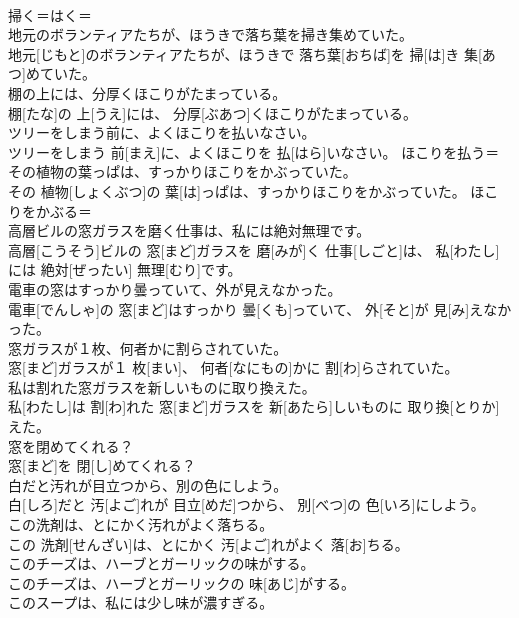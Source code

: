 \documentclass[8pt]{extreport}
\begin{document}
\begin{CJK}{UTF8}{min}
\\	掃く＝はく＝ 
\\	地元のボランティアたちが、ほうきで落ち葉を掃き集めていた。	
\\	地元[じもと]のボランティアたちが、ほうきで 落ち葉[おちば]を 掃[は]き 集[あつ]めていた。	
\\	棚の上には、分厚くほこりがたまっている。	
\\	棚[たな]の 上[うえ]には、 分厚[ぶあつ]くほこりがたまっている。	
\\	ツリーをしまう前に、よくほこりを払いなさい。	
\\	ツリーをしまう 前[まえ]に、よくほこりを 払[はら]いなさい。	ほこりを払う＝ 
\\	その植物の葉っぱは、すっかりほこりをかぶっていた。	
\\	その 植物[しょくぶつ]の 葉[は]っぱは、すっかりほこりをかぶっていた。	ほこりをかぶる＝ 
\\	高層ビルの窓ガラスを磨く仕事は、私には絶対無理です。	
\\	高層[こうそう]ビルの 窓[まど]ガラスを 磨[みが]く 仕事[しごと]は、 私[わたし]には 絶対[ぜったい] 無理[むり]です。	
\\	電車の窓はすっかり曇っていて、外が見えなかった。	
\\	電車[でんしゃ]の 窓[まど]はすっかり 曇[くも]っていて、 外[そと]が 見[み]えなかった。	
\\	窓ガラスが１枚、何者かに割らされていた。	
\\	窓[まど]ガラスが１ 枚[まい]、 何者[なにもの]かに 割[わ]らされていた。	
\\	私は割れた窓ガラスを新しいものに取り換えた。	
\\	私[わたし]は 割[わ]れた 窓[まど]ガラスを 新[あたら]しいものに 取り換[とりか]えた。	
\\	窓を閉めてくれる？	
\\	窓[まど]を 閉[し]めてくれる？	
\\	白だと汚れが目立つから、別の色にしよう。	
\\	白[しろ]だと 汚[よご]れが 目立[めだ]つから、 別[べつ]の 色[いろ]にしよう。	
\\	この洗剤は、とにかく汚れがよく落ちる。	
\\	この 洗剤[せんざい]は、とにかく 汚[よご]れがよく 落[お]ちる。	
\\	このチーズは、ハーブとガーリックの味がする。	
\\	このチーズは、ハーブとガーリックの 味[あじ]がする。	
\\	このスープは、私には少し味が濃すぎる。	

\end{CJK}
\end{document}
